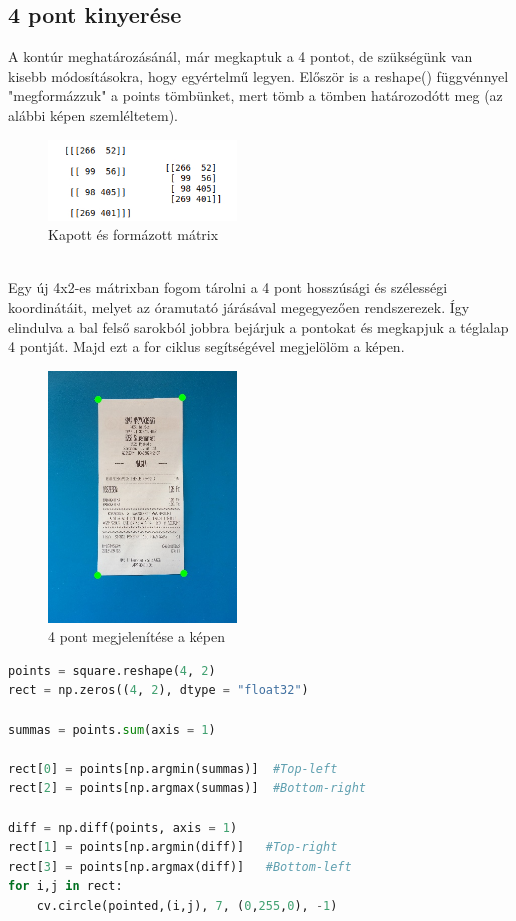 \documentclass[a4paper,12pt]{article}
\begin{document}
\subsection{4 pont kinyerése}
A kontúr meghatározásánál, már megkaptuk a 4 pontot, de szükségünk van kisebb módosításokra, hogy egyértelmű legyen. Először is a reshape() függvénnyel "megformázzuk" a points tömbünket, mert tömb a tömben határozodótt meg (az alábbi képen szemléltetem). 
\begin{figure}[h]
	\centering
	\includegraphics[width=5cm]{matrix}
	\caption{Kapott és formázott mátrix}
\end{figure}
\\Egy új 4x2-es mátrixban fogom tárolni a 4 pont hosszúsági és szélességi koordinátáit, melyet az óramutató járásával megegyezően rendszerezek. Így elindulva a bal felső sarokból jobbra bejárjuk a pontokat és megkapjuk a téglalap 4 pontját. Majd ezt a for ciklus segítségével megjelölöm a képen.
\begin{figure}[h]
	\centering
	\includegraphics[width=5cm]{6d_pointed}
	\caption{4 pont megjelenítése a képen}
\end{figure}

\begin{lstlisting}[language=Python, caption=A 4 pont rendszerezése]
points = square.reshape(4, 2)
rect = np.zeros((4, 2), dtype = "float32")

summas = points.sum(axis = 1)

rect[0] = points[np.argmin(summas)]  #Top-left
rect[2] = points[np.argmax(summas)]  #Bottom-right

diff = np.diff(points, axis = 1)
rect[1] = points[np.argmin(diff)]   #Top-right
rect[3] = points[np.argmax(diff)]   #Bottom-left
for i,j in rect:
    cv.circle(pointed,(i,j), 7, (0,255,0), -1)
\end{lstlisting}
\end{document}
